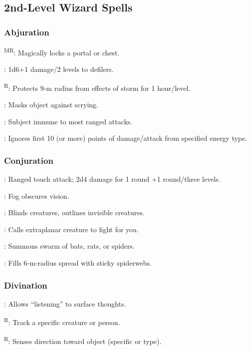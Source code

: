\subsection{2nd-Level Wizard Spells}

\subsubsection{Abjuration}
	\textsuperscript{MR}: Magically locks a portal or chest.

	: 1d6+1 damage/2 levels to defilers. %

	\textsuperscript{R}: Protects 9-m radius from effects of storm for 1 hour/level.%

	: Masks object against scrying.

	: Subject immune to most ranged attacks.

	: Ignores first 10 (or more) points of damage/attack from specified energy type.

\subsubsection{Conjuration}
	: Ranged touch attack; 2d4 damage for 1 round +1 round/three levels.

	: Fog obscures vision.

	: Blinds creatures, outlines invisible creatures.

	: Calls extraplanar creature to fight for you.

	: Summons swarm of bats, rats, or spiders.

	: Fills 6-m-radius spread with sticky spiderwebs.

\subsubsection{Divination}
	: Allows ``listening'' to surface thoughts.

	\textsuperscript{R}: Track a specific creature or person. %

	\textsuperscript{R}: Senses direction toward object (specific or type).

